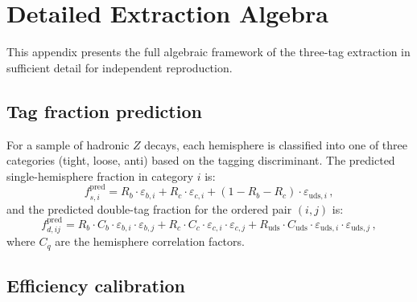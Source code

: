 \documentclass[11pt,a4paper]{article}
\begin{document}
\section{Detailed Extraction Algebra}
\label{app:algebra}

This appendix presents the full algebraic framework of the three-tag
extraction in sufficient detail for independent reproduction.

\subsection{Tag fraction prediction}

For a sample of hadronic $Z$ decays, each hemisphere is classified into
one of three categories (tight, loose, anti) based on the tagging
discriminant.  The predicted single-hemisphere fraction in category $i$
is:
\begin{equation}
  f_{s,i}^\mathrm{pred} = R_b \cdot \varepsilon_{b,i} + R_c \cdot
    \varepsilon_{c,i} + (1 - R_b - R_c) \cdot \varepsilon_{\mathrm{uds},i}\,,
  \label{eq:fs-pred}
\end{equation}
and the predicted double-tag fraction for the ordered pair $(i, j)$ is:
\begin{equation}
  f_{d,ij}^\mathrm{pred} = R_b \cdot C_b \cdot \varepsilon_{b,i} \cdot
    \varepsilon_{b,j} + R_c \cdot C_c \cdot \varepsilon_{c,i} \cdot
    \varepsilon_{c,j} + R_\mathrm{uds} \cdot C_\mathrm{uds} \cdot
    \varepsilon_{\mathrm{uds},i} \cdot \varepsilon_{\mathrm{uds},j}\,,
  \label{eq:fd-pred}
\end{equation}
where $C_q$ are the hemisphere correlation factors.

\subsection{Efficiency calibration}
\end{document}
